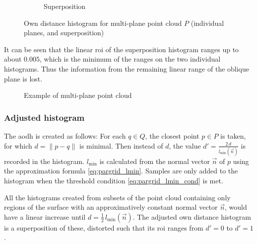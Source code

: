 \begin{figure}[H]
\begin{subfigure}{.32\textwidth}
	\caption{Superposition}
\end{subfigure}
\caption{Own distance histogram for multi-plane point cloud $P$ (individual planes, and superposition)}
\end{figure}

It can be seen that the linear \gls{roi} of the superposition histogram ranges up to about $0.005$, which is the minimum of the ranges on the two individual histograms. Thus the information from the remaining linear range of the oblique plane is lost.

\begin{figure}[p]
\centering
{
	\setlength{\fboxsep}{0pt}%
	\setlength{\fboxrule}{0.5pt}%
}
\caption{Example of multi-plane point cloud}
\label{fig:disks1}
\end{figure}

\subsubsection{Adjusted histogram}
The \gls{aodh} is created as follows: For each $q \in Q$, the closest point $p \in P$ is taken, for which $d = \|p - q\|$ is minimal. Then instead of $d$, the value $d' = \frac{2 \, d}{l_{\text{min}}(\vec{n})}$ is recorded in the histogram. $l_{\text{min}}$ is calculated from the normal vector $\vec{n}$ of $p$ using the approximation formula \ref{eq:pargrid_lmin}. Samples are only added to the histogram when the threshold condition \ref{eq:pargrid_lmin_cond} is met.

All the histograms created from subsets of the point cloud containing only regions of the surface with an approximatively constant normal vector $\vec{n}$, would have a linear increase until $d = \frac{1}{2} \, l_{\text{min}}(\vec{n})$. The adjusted own distance histogram is a superposition of these, distorted such that its \gls{roi} ranges from $d' = 0$ to $d' = 1$.

